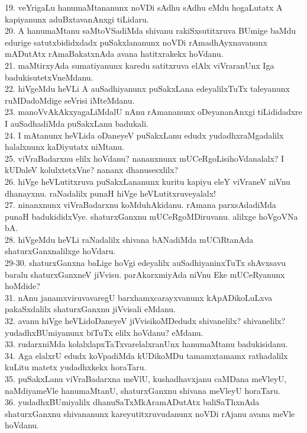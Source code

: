 \documentclass{article}
\begin{document}
19. veYrigaLu hanumaMtananunx noVDi sAdhu sAdhu eMdu hogaLutatx A kapiyanunx aduBxtavanAnxgi tiLidaru.\\
20. A hanumaMtanu saMtoVSadiMda shivanu rakiSxsutitxruva BUmige baMdu edurige satutxbididxdadx puSakxlananunx noVDi rAmadhAyxnavanunx mADutAtx rAmaBakatxnAda avana hatitxrakekx hoVdanu.\\
21. maMtirxyAda sumatiyanunx karedu satitxruva elAlx viVraranUnx Iga badukisutetxVneMdanu.\\
22. hiVgeMdu heVLi A auSadhiyanunx puSakxLana edeyalilxTuTx taleyanunx ruMDadoMdige seVrisi iMteMdanu.\\
23. manoVvAkAkxyagaLiMdalU nAnu rAmananunx oDeyananAnxgi tiLididadxre I auSadhadiMda puSakxLanu badukali.\\
24. I mAtanunx heVLida oDaneyeV puSakxLanu edudx yudadhxraMgadalilx halalxnunx kaDiyutatx niMtanu.\\
25. viVraBadarxnu elilx hoVdanu? nananxnunx mUCeRgoLisihoVdanalalx? I kUDaleV kolulxtetxVne? nananx dhanusesxlilx?\\
26. hiVge heVLutitxruva puSakxLananunx kuritu kapiyu eleY viVraneV niVnu dhanayxnu. raNadalilx punaH hiVge heVLutitxruveyalalx!\\
27. ninanxnunx viVraBadarxnu koMduhAkidanu. rAmana parxsAdadiMda punaH badukididxVye. shaturxGanxnu mUCeRgoMDiruvanu. alilxge hoVgoVNa bA.\\
28. hiVgeMdu heVLi raNadalilx shivana bANadiMda mUCiRtanAda shaturxGanxnalilxge hoVdaru.\\
29-30. shaturxGanxna baLige hoVgi edeyalilx auSadhiyaninxTuTx shAvxsavu baralu shaturxGanxneV jiVvisu. parAkarxmiyAda niVnu Eke mUCeRyanunx hoMdide?\\
31. nAnu janamxviruvavaregU barxhamxcarayxvanunx kApADikoLuLxva pakaSxdalilx shaturxGanxnu jiVvisali eMdanu.\\
32. avanu hiVge heVLidoDaneyeV jiVvisikoMDedudx shivanelilx? shivanelilx? yudadhxBUmiyanunx biTuTx elilx hoVdanu? eMdanu.\\
33. rudarxniMda kolalxlapxTaTxvarelalxranUnx hanumaMtanu badukisidanu.\\
34. Aga elalxrU edudx koVpadiMda kUDikoMDu tamamxtamamx rathadalilx kuLitu matetx yudadhxkekx horaTaru.\\
35. puSakxLanu viVraBadarxna meVlU, kushadhavxjanu caMDana meVleyU, naMdiyameVle hanumaMtanU, shaturxGanxnu shivana meVleyU horaTaru.\\
36. yudadhxBUmiyalilx dhanuSaTxMkAramADutAtx baliSaThxnAda shaturxGanxnu shivananunx kareyutitxruvudanunx noVDi rAjanu avana meVle hoVdanu.\\
\end{document}
